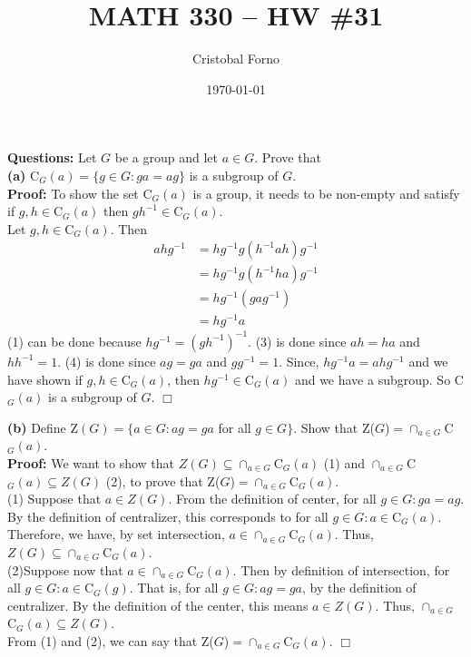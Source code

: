 \documentclass[12pt]{article}
\title{MATH 330 -- HW \#31}
\author{Cristobal Forno}
\date{\today}
\begin{document}
\maketitle

\textbf{Questions:} Let $G$ be a group and let $a \in G$. Prove that\\
\textbf{(a)} C$_{G}(a) = \{g \in G : ga = ag\}$ is a subgroup of $G$.\\
\textbf{Proof:} To show the set C$_G(a)$ is a group, it needs to be non-empty and
satisfy if $g,h \in $C$_G(a)$ then $gh^{-1} \in $C$_G(a)$.\\

Let $g,h \in $C$_G(a)$. Then
\begin{align}
  ahg^{-1} &= hg^{-1}g(h^{-1}ah)g^{-1} \\
           &= hg^{-1}g(h^{-1}ha)g^{-1} \\
           &= hg^{-1}(gag^{-1}) \\
           &= hg^{-1}a
\end{align}
(1) can be done because $hg^{-1} = (gh^{-1})^{-1}$. (3) is done since $ah=ha$
and $hh^{-1}=1$. (4) is done since $ag=ga$ and $gg^{-1} = 1$. Since, $hg^{-1}a =
ahg^{-1}$ and we have shown if $g,h \in$C$_G(a)$, then $hg^{-1} \in $C$_G(a)$ and we
have a subgroup. So C$_G(a)$ is a subgroup of $G$. $\Box$

\textbf{(b)} Define Z$(G) = \{a \in G:ag = ga $ for all $g \in G\}$. Show that Z($G$)$=
\cap_{a \in G}$C$_{G}(a)$. \\

\textbf{Proof:} We want to show that $Z(G) \subseteq \cap_{a \in G}$C$_{G}(a)$
(1) and $\cap_{a \in G}$C$_{G}(a) \subseteq Z(G)$ (2), to prove that  Z($G$)$=
\cap_{a \in G}$C$_{G}(a)$.\\

(1) Suppose that $a \in Z(G)$. From the definition of center, for all $g \in G :
ga = ag$. By the definition of centralizer, this corresponds to for all $g \in G
: a \in $C$_{G}(a)$. Therefore, we have, by set intersection, $a
\in \cap_{a \in G}$C$_{G}(a)$. Thus, $Z(G) \subseteq \cap_{a \in
  G}$C$_{G}(a)$.\\

(2)Suppose now that $a \in \cap_{a \in G}$C$_G(a)$. Then by definition of
intersection, for all $g \in G : a \in $C$_G(g)$. That is, for all $g \in G :
ag=ga$, by the definition of centralizer. By the definition of the center, this
means $a \in Z(G)$. Thus, $\cap_{a \in G}$C$_{G}(a) \subseteq Z(G)$.\\

From (1) and (2), we can say that Z($G$)$= \cap_{a \in G}$C$_{G}(a)$. $\Box$
\end{document}
